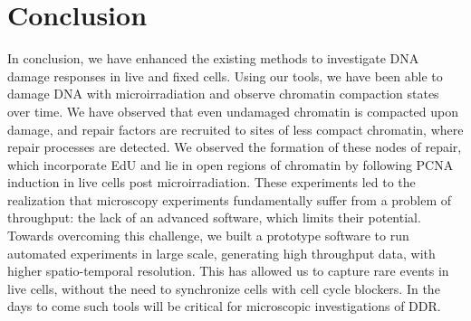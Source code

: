 \chapter{Conclusion}
In conclusion, we have enhanced the existing methods to investigate DNA damage responses in live and fixed cells. Using our tools, we have been able to damage DNA with microirradiation and observe chromatin compaction states over time. We have observed that even undamaged chromatin is compacted upon damage, and repair factors are recruited to sites of less compact chromatin, where repair processes are detected. We observed the formation of these nodes of repair, which incorporate EdU and lie in open regions of chromatin by following PCNA induction in live cells post microirradiation. These experiments led to the realization that microscopy experiments fundamentally suffer from a  problem of throughput: the lack of an advanced software, which limits their potential. Towards overcoming this challenge, we built a prototype software to run automated experiments in large scale, generating high throughput data, with higher spatio-temporal resolution. This has allowed us to capture rare events in live cells, without the need to synchronize cells with cell cycle blockers. In the days to come such tools will be critical for microscopic investigations of DDR.
